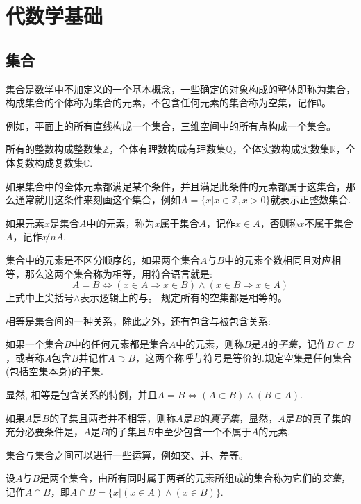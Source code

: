 
\section{代数学基础}
\label{sec:algebra-base}

\subsection{集合}
\label{sec:set}

集合是数学中不加定义的一个基本概念，一些确定的对象构成的整体即称为集合，构成集合的个体称为集合的元素，不包含任何元素的集合称为空集，记作$\emptyset$。

例如，平面上的所有直线构成一个集合，三维空间中的所有点构成一个集合。

所有的整数构成整数集$\mathbb{Z}$，全体有理数构成有理数集$\mathbb{Q}$，全体实数构成实数集$\mathbb{R}$，全体复数构成复数集$\mathbb{C}$.

如果集合中的全体元素都满足某个条件，并且满足此条件的元素都属于这集合，那么通常就用这条件来刻画这个集合，例如$A=\{ x | x \in \mathbb{Z}, x>0 \}$就表示正整数集合.

如果元素$x$是集合$A$中的元素，称为$x$属于集合$A$，记作$x \in A$，否则称$x$不属于集合$A$，记作$x \not in A$.

集合中的元素是不区分顺序的，如果两个集合$A$与$B$中的元素个数相同且对应相等，那么这两个集合称为相等，用符合语言就是:
\[ A = B \Leftrightarrow (x \in A \Rightarrow x \in B) \wedge (x \in B \Rightarrow x \in A) \]
上式中上尖括号$\wedge$表示逻辑上的与。
 规定所有的空集都是相等的。 

 相等是集合间的一种关系，除此之外，还有包含与被包含关系:
 \begin{definition}
   如果一个集合$B$中的任何元素都是集合$A$中的元素，则称$B$是$A$的\emph{子集}，记作$B \subset B$，或者称$A$包含$B$并记作$A \supset B$，这两个称呼与符号是等价的.规定空集是任何集合(包括空集本身)的子集.
 \end{definition}

 显然, 相等是包含关系的特例，并且$A=B \Leftrightarrow (A \subset B) \wedge (B \subset A)$.

 如果$A$是$B$的子集且两者并不相等，则称$A$是$B$的\emph{真子集}，显然，$A$是$B$的真子集的充分必要条件是，$A$是$B$的子集且$B$中至少包含一个不属于$A$的元素.
 
集合与集合之间可以进行一些运算，例如交、并、差等。
\begin{definition}
  设$A$与$B$是两个集合，由所有同时属于两者的元素所组成的集合称为它们的\emph{交集}，记作$A \cap B$，即$A \cap B = \{ x | (x \in A) \wedge (x \in B) \}$.
\end{definition}

